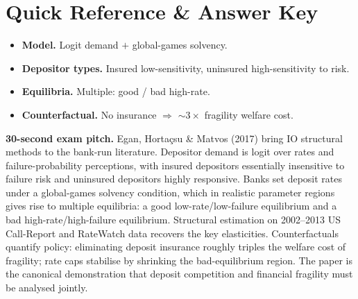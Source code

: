 \documentclass[11pt]{article}
\begin{document}
\section*{Quick Reference \& Answer Key}
\begin{answerbox}
\begin{itemize}
\item \textbf{Model.} Logit demand $+$ global-games solvency.
\item \textbf{Depositor types.} Insured low-sensitivity, uninsured high-sensitivity to risk.
\item \textbf{Equilibria.} Multiple: good / bad high-rate.
\item \textbf{Counterfactual.} No insurance $\Rightarrow$ $\sim 3\times$ fragility welfare cost.
\end{itemize}
\end{answerbox}

\begin{keybox}
\textbf{30-second exam pitch.} Egan, Hortaçsu \& Matvos (2017) bring IO structural methods to the bank-run literature. Depositor demand is logit over rates and failure-probability perceptions, with insured depositors essentially insensitive to failure risk and uninsured depositors highly responsive. Banks set deposit rates under a global-games solvency condition, which in realistic parameter regions gives rise to multiple equilibria: a good low-rate/low-failure equilibrium and a bad high-rate/high-failure equilibrium. Structural estimation on 2002--2013 US Call-Report and RateWatch data recovers the key elasticities. Counterfactuals quantify policy: eliminating deposit insurance roughly triples the welfare cost of fragility; rate caps stabilise by shrinking the bad-equilibrium region. The paper is the canonical demonstration that deposit competition and financial fragility must be analysed jointly.
\end{keybox}
\end{document}
